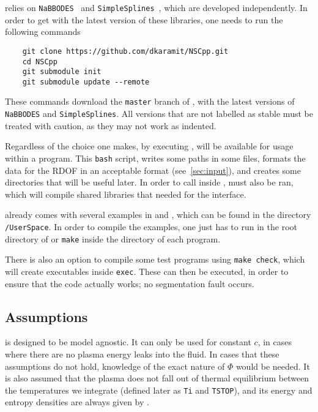 \documentclass[11pt,a4paper]{article}
\begin{document}
\nsc relies on {\tt NaBBODES}~\cite{NaBBODES} and {\tt SimpleSplines}~\cite{SimpleSplines}, which are developed independently. In order to get \nsc with the latest version of these libraries, one needs to run the following commands
%
\begin{lstlisting}
	git clone https://github.com/dkaramit/NSCpp.git
	cd NSCpp
	git submodule init
	git submodule update --remote
\end{lstlisting}
%
These commands download the {\tt master} branch of \nsc, with the latest versions of {\tt NaBBODES} and {\tt SimpleSplines}. All versions that are not labelled as stable must be treated with caution, as they may not work as indented. 

Regardless of the choice one makes, by executing , \nsc will be available for usage within a \CPP program. This {\tt bash} script, writes some paths in some files, formats the data for the RDOF in an acceptable format (see~\ref{sec:input}), and creates some directories that will be useful later. In order to call \nsc inside \PY,  must also be ran,  which will compile shared libraries that needed for the \PY interface.

\nsc already comes with several examples in \CPP and \PY, which can be found in the directory {\tt \nsc/UserSpace}. In order to compile the \CPP examples, one just has to run  in the root directory of \nsc or {\tt make} inside the directory of each \CPP program.

There is also an option to compile some test programs using {\tt make check}, which will create executables inside {\tt exec}. These can then be executed, in order to ensure that the code actually works; \eg no segmentation fault occurs. 

\subsection{Assumptions}
%
\nsc is designed to be model agnostic. It can only be used for constant $c$, in cases where there are no plasma energy leaks into the fluid. In cases that these assumptions do not hold, knowledge of the exact nature of $\Phi$ would be needed.  It is also assumed that the plasma does not fall out of thermal equilibrium between the temperatures we integrate (defined later as {\tt Ti} and {\tt TSTOP}), and its energy and entropy densities are always given by .
\end{document}
